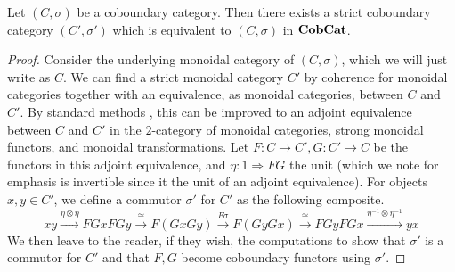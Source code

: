 \begin{prop}
Let $(C, \sigma)$ be a coboundary category. Then there exists a strict coboundary category $(C', \sigma')$ which is equivalent to $(C, \sigma)$ in $\mathbf{CobCat}$.
\end{prop}
\begin{proof}
Consider the underlying monoidal category of $(C, \sigma)$, which we will just write as $C$. We can find a strict monoidal category $C'$ by coherence for monoidal categories together with an equivalence, as monoidal categories, between $C$ and $C'$. By standard methods \cite{maclane-catwork}, this can be improved to an adjoint equivalence between $C$ and $C'$ in the $2$-category of monoidal categories, strong monoidal functors, and monoidal transformations. Let $F \colon  C \rightarrow C', G \colon C' \rightarrow C$ be the functors in this adjoint equivalence, and $\eta \colon 1 \Rightarrow FG$ the unit (which we note for emphasis is invertible since it the unit of an adjoint equivalence). For objects $x,y \in C'$, we define a commutor $\sigma'$ for $C'$ as the following composite.
  \[
    xy \xrightarrow{\eta \otimes \eta} FGxFGy
    \xrightarrow{\cong} F(GxGy)
    \xrightarrow{F\sigma} F(GyGx)
    \xrightarrow{\cong} FGyFGx
    \xrightarrow{\eta^{-1} \otimes \eta^{-1}} yx
  \]
We then leave to the reader, if they wish, the computations to show that $\sigma'$ is a commutor for $C'$ and that $F,G$ become coboundary functors using $\sigma'$.
\end{proof}

